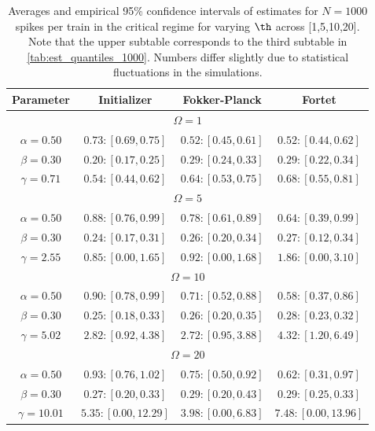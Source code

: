 \begin{table}[htp]

\begin{center}
{\begin{tabular}{|c|ccc|} 
Parameter
& Initializer
& Fokker-Planck
& Fortet
\\ 
\hline \hline
\multicolumn{4}{|c|}{$\Omega=1$} \\[1mm]
$\alpha=0.50$
& $0.73 : [0.69, 0.75]$
& $0.52 : [0.45, 0.61]$
& $0.52 : [0.44, 0.62]$
\\
$\beta=0.30$
& $0.20 : [0.17, 0.25]$
& $0.29 : [0.24, 0.33]$
& $0.29 : [0.22, 0.34]$
\\
$\gamma=0.71$
& $0.54 : [0.44, 0.62]$
& $0.64 : [0.53, 0.75]$
& $0.68 : [0.55, 0.81]$
\\
\hline \hline
\multicolumn{4}{|c|}{$\Omega=5$} \\[1mm]
$\alpha=0.50$
& $0.88 : [0.76, 0.99]$
& $0.78 : [0.61, 0.89]$
& $0.64 : [0.39, 0.99]$
\\
$\beta=0.30$
& $0.24 : [0.17, 0.31]$
& $0.26 : [0.20, 0.34]$
& $0.27 : [0.12, 0.34]$
\\
$\gamma=2.55$
& $0.85 : [0.00, 1.65]$
& $0.92 : [0.00, 1.68]$
& $1.86 : [0.00, 3.10]$
\\
\hline \hline
\multicolumn{4}{|c|}{$\Omega=10$} \\[1mm]
$\alpha=0.50$
& $0.90 : [0.78, 0.99]$
& $0.71 : [0.52, 0.88]$
& $0.58 : [0.37, 0.86]$
\\
$\beta=0.30$
& $0.25 : [0.18, 0.33]$
& $0.26 : [0.20, 0.35]$
& $0.28 : [0.23, 0.32]$
\\
$\gamma=5.02$
& $2.82 : [0.92, 4.38]$
& $2.72 : [0.95, 3.88]$
& $4.32 : [1.20, 6.49]$
\\
\hline \hline
\multicolumn{4}{|c|}{$\Omega=20$} \\[1mm]
$\alpha=0.50$
& $0.93 : [0.76, 1.02]$
& $0.75 : [0.50, 0.92]$
& $0.62 : [0.31, 0.97]$
\\
$\beta=0.30$
& $0.27 : [0.20, 0.33]$
& $0.29 : [0.20, 0.43]$
& $0.29 : [0.25, 0.33]$
\\
$\gamma=10.01$
& $5.35 : [0.00, 12.29]$
& $3.98 : [0.00, 6.83]$
& $7.48 : [0.00, 13.96]$
\\
\hline
\end{tabular}}\\
\end{center}
\caption{Averages and empirical 95\% confidence intervals of estimates for $N=1000$
spikes per train in the critical regime for varying $\th$ across
[1,5,10,20]. Note that the upper subtable corresponds to the third
subtable in \cref{tab:est_quantiles_1000}. Numbers differ slightly due to statistical
fluctuations in the simulations. }
\label{tab:thetas_est_quantiles_1000}
\end{table}
